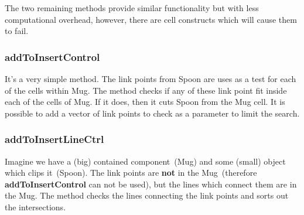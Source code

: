 The two remaining methods provide similar functionality but with less
computational overhead, however, there are cell constructs which will
cause them to fail.


\subsubsection{addToInsertControl}

It's a very simple method. The link points from Spoon are uses as a test for each of the cells within Mug. 
The method checks if any of these link point fit inside each of the cells of Mug. If it does, then it cuts Spoon from the Mug cell.
It is possible to add a vector of link points to check as a parameter to limit the search.

\subsubsection{addToInsertLineCtrl}

Imagine we have a (big) contained component~(Mug) and some (small)
object which clips it~(Spoon). The link points are {\bf not} in the
Mug~(therefore {\bf addToInsertControl} can not be used), but the
lines which connect them are in the Mug.  The method checks the lines
connecting the link points and sorts out the intersections.
